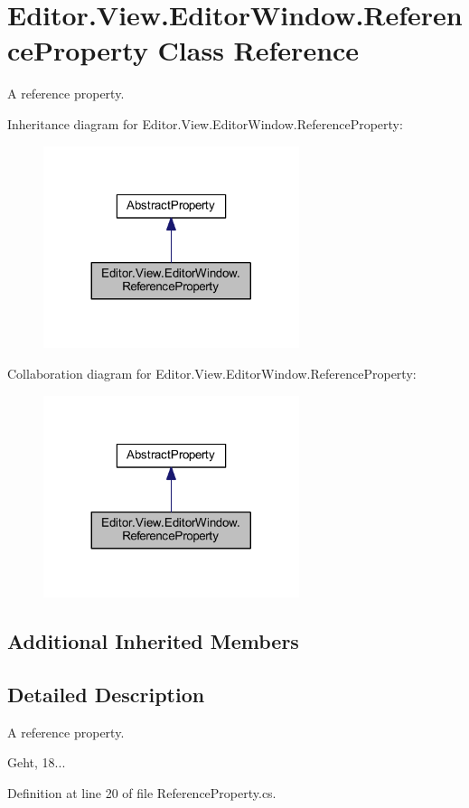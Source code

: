 \section{Editor.\-View.\-Editor\-Window.\-Reference\-Property Class Reference}
\label{class_editor_1_1_view_1_1_editor_window_1_1_reference_property}


A reference property.  




Inheritance diagram for Editor.\-View.\-Editor\-Window.\-Reference\-Property\-:
\nopagebreak
\begin{figure}[H]
\begin{center}
\leavevmode
\includegraphics[width=212pt]{class_editor_1_1_view_1_1_editor_window_1_1_reference_property__inherit__graph}
\end{center}
\end{figure}


Collaboration diagram for Editor.\-View.\-Editor\-Window.\-Reference\-Property\-:
\nopagebreak
\begin{figure}[H]
\begin{center}
\leavevmode
\includegraphics[width=212pt]{class_editor_1_1_view_1_1_editor_window_1_1_reference_property__coll__graph}
\end{center}
\end{figure}
\subsection*{Additional Inherited Members}


\subsection{Detailed Description}
A reference property. 

Geht, 18... 

Definition at line 20 of file Reference\-Property.\-cs.

